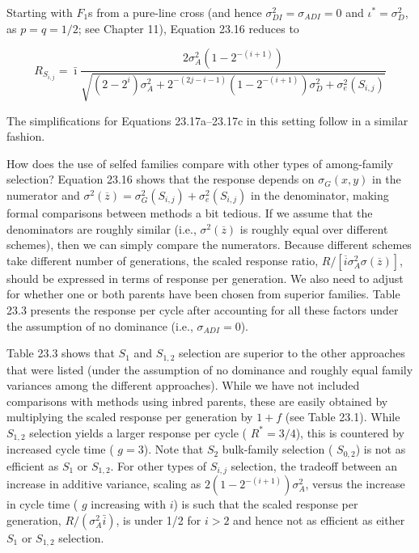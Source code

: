 \documentclass{article}
\begin{document}
Starting with  $ F_1 $s from a pure-line cross (and hence  $ \sigma_{DI}^2 = \sigma_{ADI} = 0 $ and  $ \iota^* = \sigma_D^2 $, as  $ p = q = 1/2 $; see Chapter 11), Equation 23.16 reduces to

\begin{equation}
R_{S_{i,j}}=\bar{\imath}\frac{2\sigma_{A}^{2}(1-2^{-(i+1)})}{\sqrt{(2-2^{i})\sigma_{A}^{2}+2^{-(2j-i-1)}(1-2^{-(i+1)})\sigma_{D}^{2}+\sigma_{e}^{2}(S_{i,j})}}
\tag{23.18}
\label{eq:23_18}
\end{equation}

The simplifications for Equations 23.17a–23.17c in this setting follow in a similar fashion.

How does the use of selfed families compare with other types of among-family selection? Equation 23.16 shows that the response depends on  $ \sigma_G(x,y) $ in the numerator and  $ \sigma^2(\overline{z}) = \sigma_G^2(S_{i,j}) + \sigma_e^2(S_{i,j}) $ in the denominator, making formal comparisons between methods a bit tedious. If we assume that the denominators are roughly similar (i.e.,  $ \sigma^2(\overline{z}) $ is roughly equal over different schemes), then we can simply compare the numerators. Because different schemes take different number of generations, the scaled response ratio,  $ R/[\overline{i}\sigma_A^2\sigma(\overline{z})] $, should be expressed in terms of response per generation. We also need to adjust for whether one or both parents have been chosen from superior families. Table 23.3 presents the response per cycle after accounting for all these factors under the assumption of no dominance (i.e.,  $ \sigma_{ADI} = 0 $).

Table 23.3 shows that  $ S_1 $ and  $ S_{1,2} $ selection are superior to the other approaches that were listed (under the assumption of no dominance and roughly equal family variances among the different approaches). While we have not included comparisons with methods using inbred parents, these are easily obtained by multiplying the scaled response per generation by  $ 1 + f $ (see Table 23.1). While  $ S_{1,2} $ selection yields a larger response per cycle ( $ R^* = 3/4 $), this is countered by increased cycle time ( $ g = 3 $). Note that  $ S_2 $ bulk-family selection ( $ S_{0,2} $) is not as efficient as  $ S_1 $ or  $ S_{1,2} $. For other types of  $ S_{i,j} $ selection, the tradeoff between an increase in additive variance, scaling as  $ 2(1 - 2^{-(i+1)})\sigma_A^2 $, versus the increase in cycle time ( $ g $ increasing with  $ i $) is such that the scaled response per generation,  $ R/(\sigma_A^2\bar{i}) $, is under 1/2 for  $ i > 2 $ and hence not as efficient as either  $ S_1 $ or  $ S_{1,2} $ selection.
\end{document}
